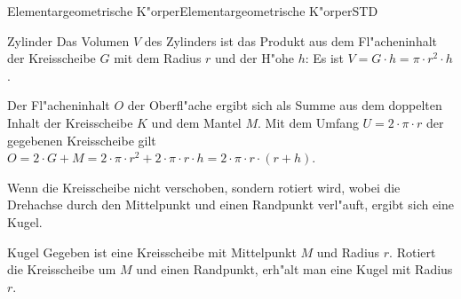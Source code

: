 \begin{MXContent}{Elementargeometrische K"orper}{Elementargeometrische K"orper}{STD}
\begin{MXInfo}{Zylinder}
Das Volumen $V$ des Zylinders ist das Produkt aus dem Fl"acheninhalt der 
Kreisscheibe $G$ mit dem Radius $r$ und der H"ohe $h$: 
Es ist $V = G \cdot h = \pi \cdot r^2 \cdot h$.

Der Fl"acheninhalt $O$ der Oberfl"ache ergibt sich als Summe aus dem doppelten
Inhalt der Kreisscheibe $K$ und dem Mantel $M$.
Mit dem Umfang $U = 2 \cdot \pi \cdot r$ der gegebenen Kreisscheibe
gilt 
$O = 2 \cdot G + M = 2 \cdot \pi \cdot r^2 + 2 \cdot \pi \cdot r \cdot h %
 = 2 \cdot \pi \cdot r \cdot (r + h)$.
\end{MXInfo}

Wenn die Kreisscheibe nicht verschoben, sondern rotiert wird, wobei die 
Drehachse durch den Mittelpunkt und einen Randpunkt verl"auft, ergibt sich
eine Kugel.

\begin{MXInfo}{Kugel}
Gegeben ist eine Kreisscheibe mit Mittelpunkt $M$ und Radius $r$. Rotiert die
Kreisscheibe um $M$ und einen Randpunkt, erh"alt man eine Kugel mit 
Radius $r$.

\usetikzlibrary{fadings}
\begin{center}
\end{center}


\end{MXInfo}
\end{MXContent}
